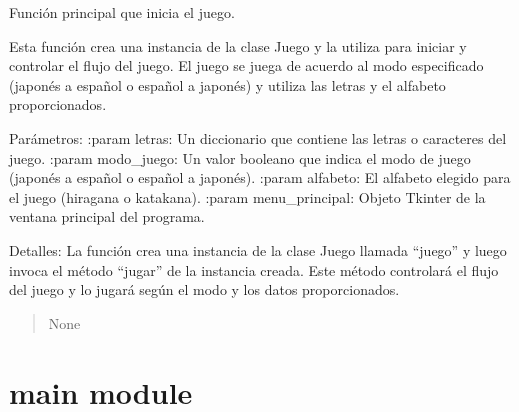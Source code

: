 \documentclass[letterpaper,10pt,spanish]{sphinxmanual}
\begin{document}

\begin{fulllineitems}
\label{\detokenize{juego:juego.main}}
\pysigstartsignatures
{}
\pysigstopsignatures
\sphinxAtStartPar
Función principal que inicia el juego.

\sphinxAtStartPar
Esta función crea una instancia de la clase Juego y la utiliza para iniciar
y controlar el flujo del juego. El juego se juega de acuerdo al modo especificado
(japonés a español o español a japonés) y utiliza las letras y el alfabeto
proporcionados.

\sphinxAtStartPar
Parámetros:
:param letras: Un diccionario que contiene las letras o caracteres del juego.
:param modo\_juego: Un valor booleano que indica el modo de juego (japonés a español o español a japonés).
:param alfabeto: El alfabeto elegido para el juego (hiragana o katakana).
:param menu\_principal: Objeto Tkinter de la ventana principal del programa.

\sphinxAtStartPar
Detalles:
La función crea una instancia de la clase Juego llamada “juego” y luego invoca el método
“jugar” de la instancia creada. Este método controlará el flujo del juego y lo jugará según
el modo y los datos proporcionados.
\begin{quote}\begin{description}
\sphinxAtStartPar
None

\end{description}\end{quote}

\end{fulllineitems}


\sphinxstepscope


\chapter{main module}
\label{\detokenize{main:module-main}}\label{\detokenize{main:main-module}}\label{\detokenize{main::doc}}
\end{document}
